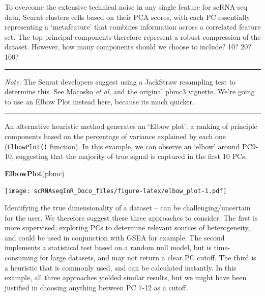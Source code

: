 \documentclass[
]{book}
\newenvironment{Shaded}{\begin{snugshade}}{\end{snugshade}}
\newcommand{\FunctionTok}[1]{\textcolor[rgb]{0.13,0.29,0.53}{\textbf{#1}}}
\newcommand{\NormalTok}[1]{#1}
\begin{document}
To overcome the extensive technical noise in any single feature for scRNA-seq data, Seurat clusters cells based on their PCA scores, with each PC essentially representing a `metafeature' that combines information across a correlated feature set. The top principal components therefore represent a robust compression of the dataset. However, how many components should we choose to include? 10? 20? 100?

\begin{center}\rule{0.5\linewidth}{0.5pt}\end{center}

\emph{Note}: The Seurat developers suggest using a JackStraw resampling test to determine this. See \href{http://www.cell.com/abstract/S0092-8674(15)00549-8}{Macosko \emph{et al}}, and the original \href{https://satijalab.org/seurat/articles/pbmc3k_tutorial.html\#determine-the-dimensionality-of-the-dataset-1}{pbmc3 vignette}. We're going to use an Elbow Plot instead here, because its much quicker.

\begin{center}\rule{0.5\linewidth}{0.5pt}\end{center}

An alternative heuristic method generates an `Elbow plot': a ranking of principle components based on the percentage of variance explained by each one (\texttt{ElbowPlot()} function). In this example, we can observe an `elbow' around PC9-10, suggesting that the majority of true signal is captured in the first 10 PCs.

\begin{Shaded}
\begin{Highlighting}[]
\FunctionTok{ElbowPlot}\NormalTok{(pbmc)}
\end{Highlighting}
\end{Shaded}

\texttt{[image: scRNAseqInR\_Doco\_files/figure-latex/elbow\_plot-1.pdf]}

Identifying the true dimensionality of a dataset -- can be challenging/uncertain for the user. We therefore suggest these three approaches to consider. The first is more supervised, exploring PCs to determine relevant sources of heterogeneity, and could be used in conjunction with GSEA for example. The second implements a statistical test based on a random null model, but is time-consuming for large datasets, and may not return a clear PC cutoff. The third is a heuristic that is commonly used, and can be calculated instantly. In this example, all three approaches yielded similar results, but we might have been justified in choosing anything between PC 7-12 as a cutoff.
\end{document}
